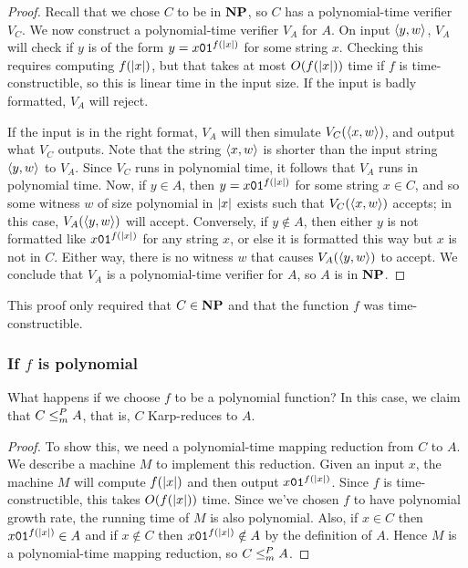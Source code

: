 \documentclass[11pt,twoside=off,numbers=noenddot]{scrbook}
\begin{document}
\begin{proof}
  Recall that we chose $C$ to be in $\textbf{NP}$, so $C$ has a polynomial-time verifier $V_C$. We now construct a polynomial-time verifier $V_A$ for $A$. On input $\left< y, w \right>$, $V_A$ will check if $y$ is of the form $y = x\texttt{0}\texttt{1}^{f(| x |)}$ for some string $x$. Checking this requires computing $f(| x |)$, but that takes at most $O(f(| x |))$ time if $f$ is time-constructible, so this is linear time in the input size. If the input is badly formatted, $V_A$ will reject.

  If the input is in the right format, $V_A$ will then simulate $V_C(\left< x, w \right>)$, and output what $V_C$ outputs. Note that the string $\left< x, w \right>$ is shorter than the input string $\left< y, w \right>$ to $V_A$. Since $V_C$ runs in polynomial time, it follows that $V_A$ runs in polynomial time. Now, if $y \in A$, then $y = x\texttt{0}\texttt{1}^{f(| x |)}$ for some string $x \in C$, and so some witness $w$ of size polynomial in $| x |$ exists such that $V_C(\left< x, w \right>)$ accepts; in this case, $V_A(\left< y, w \right>)$ will accept. Conversely, if $y \notin A$, then either $y$ is not formatted like $x\texttt{0}\texttt{1}^{f(| x |)}$ for any string $x$, or else it is formatted this way but $x$ is not in $C$. Either way, there is no witness $w$ that causes $V_A(\left< y, w \right>)$ to accept. We conclude that $V_A$ is a polynomial-time verifier for $A$, so $A$ is in $\textbf{NP}$.
\end{proof}

This proof only required that $C \in \textbf{NP}$ and that the function $f$ was time-constructible.

\subsubsection{If $f$ is polynomial}
What happens if we choose $f$ to be a polynomial function? In this case, we claim that $C \leq_m^P A$, that is, $C$ Karp-reduces to $A$.

\begin{proof}
  To show this, we need a polynomial-time mapping reduction from $C$ to $A$. We describe a machine $M$ to implement this reduction. Given an input $x$, the machine $M$ will compute $f(| x |)$ and then output $x\texttt{0}\texttt{1}^{f(| x |)}$. Since $f$ is time-constructible, this takes $O(f(| x |))$ time. Since we've chosen $f$ to have polynomial growth rate, the running time of $M$ is also polynomial. Also, if $x \in C$ then $x\texttt{0}\texttt{1}^{f(| x |)} \in A$ and if $x \notin C$ then $x\texttt{0}\texttt{1}^{f(| x |)} \notin A$ by the definition of $A$. Hence $M$ is a polynomial-time mapping reduction, so $C \leq_m^P A$.
\end{proof}
\end{document}
